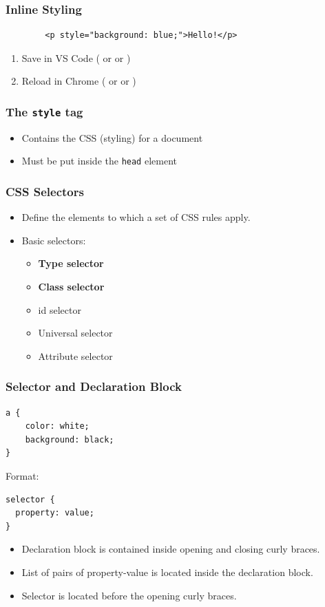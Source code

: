\documentclass[12pt]{beamer}
\begin{document}
\begin{frame}[fragile]
\frametitle{Inline Styling}
\begin{verbatim}
		<p style="background: blue;">Hello!</p>
\end{verbatim}
\begin{enumerate}
	\item Save in VS Code ( or  or )
	\item Reload in Chrome ( or  or )
\end{enumerate}
\end{frame}

\begin{frame}
\frametitle{The \texttt{style} tag}
\begin{itemize}
	\item Contains the CSS (styling) for a document\footnotemark
	\item Must be put inside the \texttt{head} element
\end{itemize}
\end{frame}

\begin{frame}
\frametitle{CSS Selectors}
\begin{itemize}
	\item Define the elements to which a set of CSS rules apply.\footnotemark
	\item Basic selectors:
	\begin{itemize}
		\item \textbf{Type selector}
		\item \textbf{Class selector}
		\item id selector
		\item Universal selector
		\item Attribute selector
	\end{itemize}
\end{itemize}
\end{frame}

\begin{frame}[fragile]
\frametitle{Selector and Declaration Block}
\begin{verbatim}
a {
	color: white;
	background: black;
}
\end{verbatim}
Format:
\begin{verbatim}
selector {
  property: value;
}
\end{verbatim}
\begin{itemize}
	\item Declaration block is contained inside opening and closing curly braces.
	\item List of pairs of property-value is located inside the declaration block.
	\item Selector is located before the opening curly braces.
\end{itemize}
\end{frame}
\end{document}
